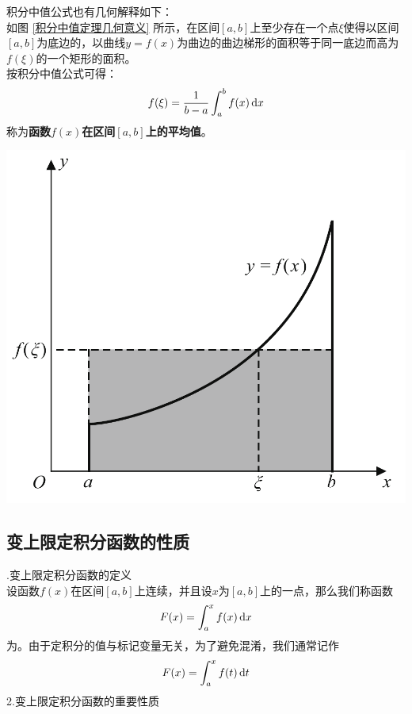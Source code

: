 \noindent
\begin{minipage}{0.5\linewidth}
	\hspace*{2em} 积分中值公式也有几何解释如下：\\
\hspace*{2em} 如图 \ref{积分中值定理几何意义} 所示，在区间$[a,b]$上至少存在一个点$\xi$使得以区间$[a,b]$为底边的，以曲线$y=f(x)$为曲边的曲边梯形的面积等于同一底边而高为$f(\xi)$的一个矩形的面积。\\ 
\hspace*{2em} 按积分中值公式可得：
\begin{equation}
	\nonumber
f(\xi)=\frac{1}{b-a}\int_{a}^{b}f(x) \,{\rm{d}} x
\end{equation}
称为\textbf{函数$f(x)$在区间$[a,b]$上的平均值}。
\end{minipage}
\begin{minipage}{0.5\linewidth}
	\centering
	\includegraphics[width=0.7\linewidth]{pic/C-4/积分中值定理几何意义}
	\vspace*{-1em}
	\label{积分中值定理几何意义}
\end{minipage}

\subsection{变上限定积分函数的性质}
.\enspace 变上限定积分函数的定义\\
\hspace*{2em} 设函数$f(x)$在区间$[a,b]$上连续，并且设$x$为$[a,b]$上的一点，那么我们称函数
\begin{equation}
	F(x)=\int_{a}^{x}f(x) \,{\rm{d}} x
\end{equation}
为。由于定积分的值与标记变量无关，为了避免混淆，我们通常记作
\begin{equation}
	F(x)=\int_{a}^{x}f(t)\,{\rm{d}} t
\end{equation}
2.\enspace 变上限定积分函数的重要性质

